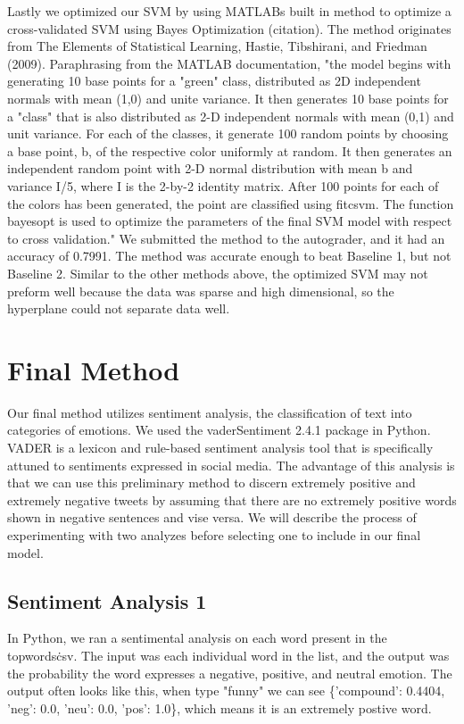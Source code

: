 \documentclass[]{article}
\begin{document}
Lastly we optimized our SVM by using MATLABs built in method to optimize a cross-validated SVM using Bayes Optimization (citation). The method originates from The Elements of Statistical Learning, Hastie, Tibshirani, and Friedman (2009). Paraphrasing from the MATLAB documentation,  "the model begins with generating 10 base points for a "green" class, distributed as 2D independent normals with mean (1,0) and unite variance. It then generates 10 base points for a "class" that is also distributed as 2-D independent normals with mean (0,1) and unit variance. For each of the classes, it generate 100 random points by choosing a base point, b, of the respective color uniformly at random. It then generates an independent random point with 2-D normal distribution with mean b and variance I/5, where I is the 2-by-2 identity matrix. After 100 points for each of the colors has been generated, the point are classified using fitcsvm. The function bayesopt is used to optimize the parameters of the final SVM model with respect to cross validation." We submitted the method to the autograder, and it had an accuracy of 0.7991. The method was accurate enough to beat Baseline 1, but not Baseline 2. Similar to the other methods above, the optimized SVM may not preform well because the data was sparse and high dimensional, so the hyperplane could not separate data well. 

\section{Final Method}

Our final method utilizes sentiment analysis, the classification of text into categories of emotions. We used the vaderSentiment 2.4.1 package in Python. VADER is a lexicon and rule-based sentiment analysis tool that is specifically attuned to sentiments expressed in social media. The advantage of this analysis is that we can use this preliminary method to discern extremely positive and extremely negative tweets by assuming that there are no extremely positive words shown in negative sentences and vise versa. We will describe the process of experimenting with two analyzes before selecting one to include in our final model. \\

\subsection{Sentiment Analysis 1}

In Python, we ran a sentimental analysis on each word present in the topwords\.csv. The input was each individual word in the list, and the output was the probability the word expresses a negative, positive, and neutral emotion. The output often looks like this, when type "funny" we can see \{'compound': 0.4404, 'neg': 0.0, 'neu': 0.0, 'pos': 1.0\}, which means it is an extremely postive word. \\
\end{document}
